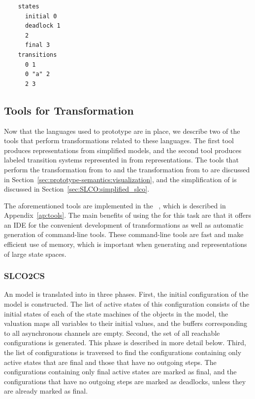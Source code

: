 \begin{listing}
  \lstset{
    language=lts,
    caption=A small labeled transition system represented in the language~\LTS,
    label=lst:prototype-semantics:lts,
    numbers=none
  }
  \begin{lstlisting}
    states
      initial 0
      deadlock 1
      2
      final 3
    transitions
      0 1
      0 "a" 2
      2 3
  \end{lstlisting}
\end{listing}

\subsection{Tools for Transformation}
Now that the languages used to prototype \SLCO are in place, we describe two of the tools that perform transformations related to these languages.
The first tool produces \CS representations from simplified \SLCO models, and the second tool produces labeled transition systems represented in \LTS from \CS representations.
The tools that perform the transformation from \LTS to \DOT and the transformation from \CS to \DOT are discussed in Section~\ref{sec:prototype-semantics:visualization}, and the simplification of \SLCO is discussed in Section~\ref{sec:SLCO:simplified_slco}.

The aforementioned tools are implemented in the \ASFSDFME~\cite{Brand:2001:ASF}, which is described in Appendix~\ref{ap:tools}.
The main benefits of using the \ASFSDFME for this task are that it offers an IDE for the convenient development of transformations as well as automatic generation of command-line tools.
These command-line tools are fast and make efficient use of memory, which is important when generating \CS and \LTS representations of large state spaces.

\subsubsection{SLCO2CS}

An \SLCO model is translated into \CS in three phases.
First, the initial configuration of the model is constructed.
The list of active states of this configuration consists of the initial states of each of the state machines of the objects in the model, the valuation maps all variables to their initial values, and the buffers corresponding to all asynchronous channels are empty.
Second, the set of all reachable configurations is generated.
This phase is described in more detail below.
Third, the list of configurations is traversed to find the configurations containing only active states that are final and those that have no outgoing steps.
The configurations containing only final active states are marked as final, and the configurations that have no outgoing steps are marked as deadlocks, unless they are already marked as final.

